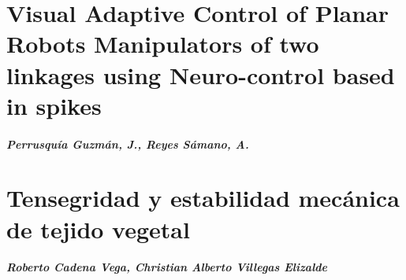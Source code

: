     \chapter{Visual Adaptive Control of Planar Robots Manipulators of two linkages using Neuro-control based in spikes}
    \paragraph{Perrusqu\'ia Guzm\'an, J., Reyes S\'amano, A.}
    

    \chapter{Tensegridad y estabilidad mecánica de tejido vegetal}
    \paragraph{Roberto Cadena Vega, Christian Alberto Villegas Elizalde}



